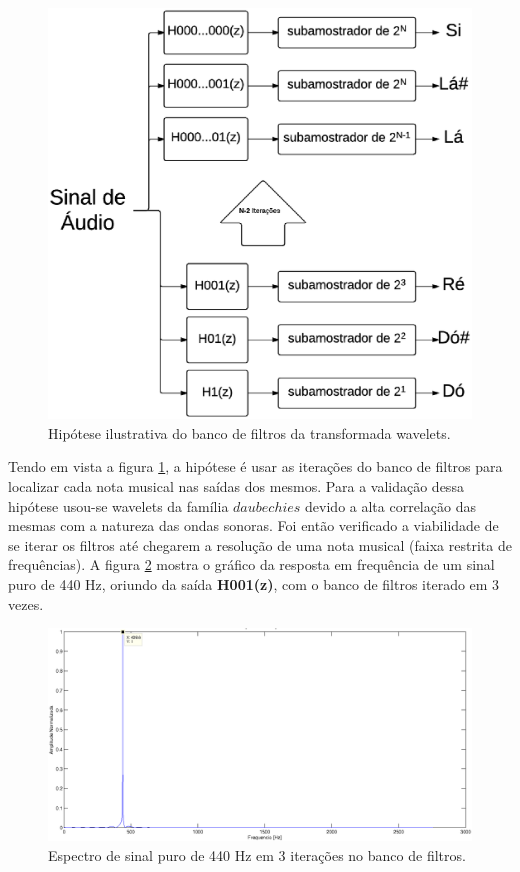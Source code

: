 \begin{figure}[h]
    \centering
    \includegraphics[keepaspectratio=true,scale=0.7]{figuras/wavelet_figura.eps}
  \caption{Hipótese ilustrativa do banco de filtros da transformada wavelets.}
  \label{fig:banco_de_filtros}
\end{figure}

Tendo em vista a figura \ref{fig:banco_de_filtros}, a hipótese é usar as iterações do banco de filtros para localizar cada nota musical nas saídas dos mesmos. Para a validação dessa hipótese usou-se wavelets da família $daubechies$ devido a alta correlação das mesmas com a natureza das ondas sonoras. Foi então verificado a viabilidade de se iterar os filtros até chegarem a resolução de uma nota musical (faixa restrita de frequências). A figura \ref{fig:440_wavelets_1} mostra o gráfico da resposta em frequência de um sinal puro de 440 Hz, oriundo da saída \textbf{H001(z)}, com o banco de filtros iterado em 3 vezes.

\begin{figure}[h]
    \centering
    \includegraphics[keepaspectratio=true,scale=0.45]{figuras/wavelet_deslocado_1.eps}
  \caption{Espectro de sinal puro de 440 Hz em 3 iterações no banco de filtros.}
  \label{fig:440_wavelets_1}
\end{figure}


